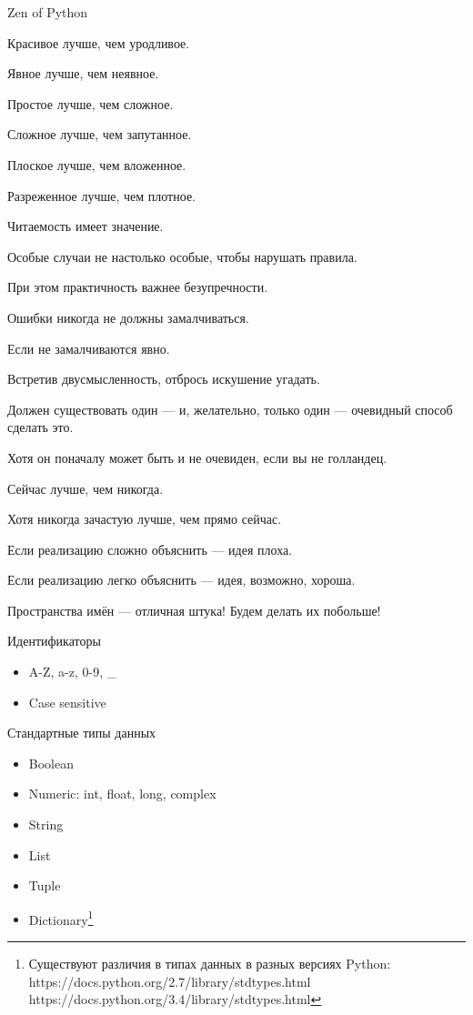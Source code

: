 \documentclass[hyperref={pdftex,unicode}]{beamer}
\begin{document}
\begin{frame}{Zen of Python}
\footnotesize{
Красивое лучше, чем уродливое.

Явное лучше, чем неявное.

Простое лучше, чем сложное.

Сложное лучше, чем запутанное.

Плоское лучше, чем вложенное.

Разреженное лучше, чем плотное.

Читаемость имеет значение.

Особые случаи не настолько особые, чтобы нарушать правила.

При этом практичность важнее безупречности.

Ошибки никогда не должны замалчиваться.

Если не замалчиваются явно.

Встретив двусмысленность, отбрось искушение угадать.

Должен существовать один --- и, желательно, только один — очевидный способ сделать это.

Хотя он поначалу может быть и не очевиден, если вы не голландец.

Сейчас лучше, чем никогда.

Хотя никогда зачастую лучше, чем прямо сейчас.

Если реализацию сложно объяснить — идея плоха.

Если реализацию легко объяснить — идея, возможно, хороша.

Пространства имён — отличная штука! Будем делать их побольше!}
\end{frame}

\begin{frame}{Идентификаторы}
  \begin{itemize}
    \item A-Z, a-z, 0-9, \_
    \item Case sensitive
  \end{itemize}
\end{frame}

\begin{frame}{Стандартные типы данных}
  \begin{itemize}
    \item Boolean
    \item Numeric: int, float, long, complex
    \item String
    \item List
    \item Tuple
    \item Dictionary\footnote[frame]{
        Существуют различия в типах данных в разных версиях Python: \\
        https://docs.python.org/2.7/library/stdtypes.html \\
        https://docs.python.org/3.4/library/stdtypes.html}
  \end{itemize}
\end{frame}
\end{document}
